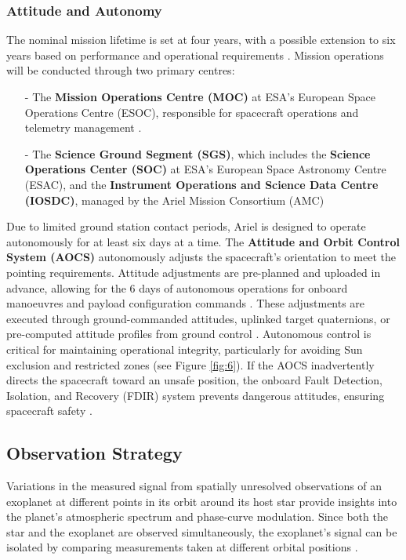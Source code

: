 \documentclass[12pt]{article}
\begin{document}
\subsubsection{Attitude and Autonomy} \label{sec:2.1.3}

The nominal mission lifetime is set at four years, with a possible extension to six years based on performance and operational requirements \cite{salvignol2024ariel}. Mission operations will be conducted through two primary centres:

\begin{itemize}
    \item[-] The \textbf{Mission Operations Centre (MOC)} at ESA's European Space Operations Centre (ESOC), responsible for spacecraft operations and telemetry management \cite{salvignol2024ariel}.
    \item[-] The \textbf{Science Ground Segment (SGS)}, which includes the \textbf{Science Operations Center (SOC)} at ESA's European Space Astronomy Centre (ESAC), and the \textbf{Instrument Operations and Science Data Centre (IOSDC)}, managed by the Ariel Mission Consortium (AMC) \cite{salvignol2024ariel}
\end{itemize}

Due to limited ground station contact periods, Ariel is designed to operate autonomously for at least six days at a time. The \textbf{Attitude and Orbit Control System (AOCS)} autonomously adjusts the spacecraft's orientation to meet the pointing requirements. Attitude adjustments are pre-planned and uploaded in advance, allowing for the 6 days of autonomous operations for onboard manoeuvres and payload configuration commands \cite{salvignol2024ariel}.
These adjustments are executed through ground-commanded attitudes, uplinked target quaternions, or pre-computed attitude profiles from ground control \cite{salvignol2024ariel}.
Autonomous control is critical for maintaining operational integrity, particularly for avoiding Sun exclusion and restricted zones (see Figure \ref{fig:6}). If the AOCS inadvertently directs the spacecraft toward an unsafe position, the onboard Fault Detection, Isolation, and Recovery (FDIR) system prevents dangerous attitudes, ensuring spacecraft safety \cite{salvignol2024ariel}.

\subsection{Observation Strategy} \label{sec:2.2}

Variations in the measured signal from spatially unresolved observations of an exoplanet at different points in its orbit around its host star provide insights into the planet's
atmospheric spectrum and phase-curve modulation. Since both the star and the exoplanet are observed simultaneously, the exoplanet's signal can be isolated by comparing measurements taken at different orbital positions \cite{salvignol2024ariel}.
\end{document}
